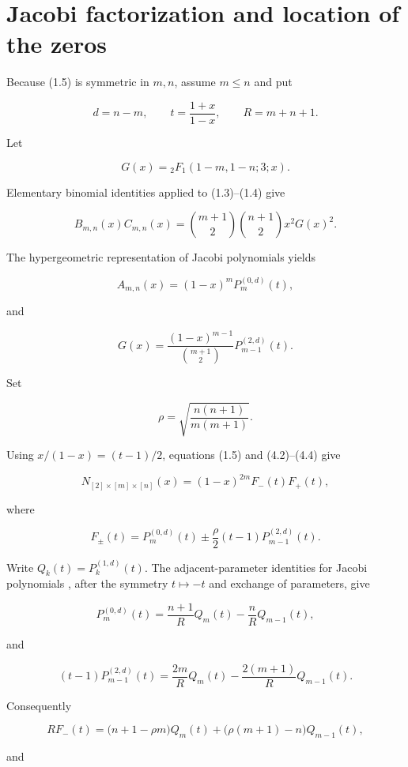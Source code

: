 \documentclass[11pt]{article}
\numberwithin{equation}{section}
\begin{document}
\section{Jacobi factorization and location of the zeros}


Because (1.5) is symmetric in $m,n$, assume $m\leq n$ and put

\nopagebreak[4]
\[
d=n-m,\qquad t=\frac{1+x}{1-x},\qquad R=m+n+1.
\tag{4.1}
\]

Let

\nopagebreak[4]
\[
G(x)={}_2F_1(1-m,1-n;3;x).
\]

Elementary binomial identities applied to (1.3)--(1.4) give

\nopagebreak[4]
\[
B_{m,n}(x)C_{m,n}(x)
=\binom{m+1}{2}\binom{n+1}{2}x^2G(x)^2.
\tag{4.2}
\]

The hypergeometric representation of Jacobi polynomials \cite[Eq.~18.5.8]{dlmf} yields

\nopagebreak[4]
\[
A_{m,n}(x)=(1-x)^mP_m^{(0,d)}(t),
\tag{4.3}
\]

and

\nopagebreak[4]
\[
G(x)=\frac{(1-x)^{m-1}}{\binom{m+1}{2}}
P_{m-1}^{(2,d)}(t).
\tag{4.4}
\]

Set

\nopagebreak[4]
\[
\rho=\sqrt{\frac{n(n+1)}{m(m+1)}}.
\]

Using $x/(1-x)=(t-1)/2$, equations (1.5) and (4.2)--(4.4) give

\nopagebreak[4]
\[
N_{[2]\times[m]\times[n]}(x)
=(1-x)^{2m}F_-(t)F_+(t),
\tag{4.5}
\]

where

\nopagebreak[4]
\[
F_\pm(t)=P_m^{(0,d)}(t)
\pm\frac{\rho}{2}(t-1)P_{m-1}^{(2,d)}(t).
\tag{4.6}
\]

Write $Q_k(t)=P_k^{(1,d)}(t)$. The adjacent-parameter identities for Jacobi
polynomials \cite[Eqs.~18.9.5--18.9.6]{dlmf}, after the symmetry
$t\mapsto-t$ and exchange of parameters, give

\nopagebreak[4]
\[
P_m^{(0,d)}(t)=\frac{n+1}{R}Q_m(t)-\frac nR Q_{m-1}(t),
\tag{4.7}
\]

and

\nopagebreak[4]
\[
(t-1)P_{m-1}^{(2,d)}(t)
=\frac{2m}{R}Q_m(t)-\frac{2(m+1)}R Q_{m-1}(t).
\tag{4.8}
\]

Consequently

\nopagebreak[4]
\[
RF_-(t)=\bigl(n+1-\rho m\bigr)Q_m(t)
+\bigl(\rho(m+1)-n\bigr)Q_{m-1}(t),
\tag{4.9}
\]

and
\end{document}
